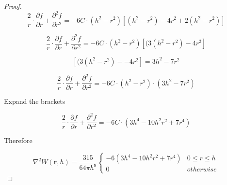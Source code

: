 \documentclass[12pt]{article}
\begin{document}
\begin{proof}
        $$\frac{2}{r} \cdot \frac{\partial{f}}{\partial{r}} + \frac{\partial^2{f}}{\partial{r^2}} = -6C \cdot (h^2 - r^2) \left[(h^2 - r^2) - 4r^2 + 2(h^2 - r^2)\right]$$

        $$\frac{2}{r} \cdot \frac{\partial{f}}{\partial{r}} + \frac{\partial^2{f}}{\partial{r^2}} = -6C \cdot (h^2 - r^2) \left[(3(h^2 - r^2) - 4r^2\right]$$

        $$\left[(3(h^2 - r^2) - - 4r^2\right] = 3h^2 - 7r^2$$

        $$\frac{2}{r} \cdot \frac{\partial{f}}{\partial{r}} + \frac{\partial^2{f}}{\partial{r^2}} = -6C \cdot (h^2 - r^2) \cdot (3h^2 - 7r^2)$$

        Expand the brackets

        $$\frac{2}{r} \cdot \frac{\partial{f}}{\partial{r}} + \frac{\partial^2{f}}{\partial{r^2}} = -6C \cdot (3h^4 - 10h^2r^2 + 7r^4)$$

        Therefore

        $$\nabla^2 W(\textbf{r}, h) = \frac{315}{64\pi{h}^9}
        \begin{cases}
            -6(3h^4 - 10h^2r^2 + 7r^4) & 0 \leq r \leq h \\
            0 & otherwise
        \end{cases}$$
    \end{proof}
\end{document}
